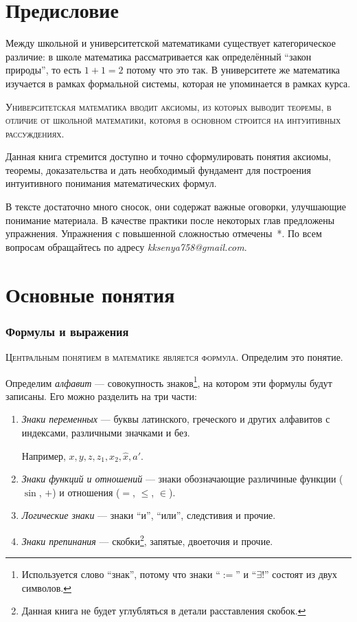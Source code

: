 \part{Предисловие}

Между школьной и университетской математиками существует категорическое
различие: в школе математика рассматривается как определённый ``закон природы'',
то есть $1+1=2$ потому что это так. В университете же математика изучается
в рамках формальной системы, которая не упоминается в рамках курса.

\textsc{Университетская математика вводит аксиомы, из которых выводит теоремы,
	в отличие от школьной математики, которая
	в основном строится на интуитивных рассуждениях.}

Данная книга стремится доступно и точно сформулировать понятия аксиомы,
теоремы, доказательства и дать необходимый фундамент для построения
интуитивного понимания математических формул.

В тексте достаточно много сносок, они содержат важные оговорки,
улучшающие понимание материала. В качестве практики
после некоторых глав предложены упражнения. Упражнения с повышенной сложностью
отмечены~*.
По всем вопросам обращайтесь по адресу {\sl kksenya758@gmail.com}.

\part{Основные понятия}

\section{Формулы и выражения}

\textsc{Центральным понятием в математике является формула.}
Определим это понятие.

Определим {\it алфавит} --- совокупность знаков\footnote{
	Используется слово ``знак'', потому что знаки ``$:=$'' и ``$\exists!$''
	состоят из двух символов.
}, на котором эти
формулы будут записаны. Его можно разделить на три части:
\begin{enumerate}
	\item{}{\it Знаки переменных} --- буквы латинского,
	греческого и других алфавитов с индексами, различными значками и без.

	Например, $x,y,z,z_1,x_2,\hat x,a'$.

	\item{}{\it Знаки функций и отношений} --- знаки обозначающие
	различиные функции ($\sin$, $+$) и отношения ($=$, $\leq$, $\in$).

	\item{}{\it Логические знаки} --- знаки ``и'', ``или'', следстивия и прочие.

	\item{}{\it Знаки препинания} --- скобки\footnote{
		Данная книга не будет углубляться в детали расставления скобок.
	}, запятые, двоеточия и прочие.
\end{enumerate}

